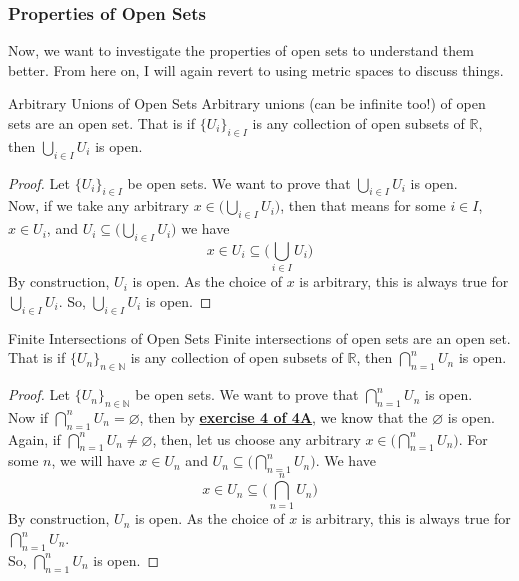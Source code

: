 \subsubsection{Properties of Open Sets}
\noindent Now, we want to investigate the properties of open sets to understand them better. From here on, I will again revert to using metric spaces to discuss things.
\begin{Theorem}{Arbitrary Unions of Open Sets}\label{union_open_sets}
    Arbitrary unions (can be infinite too!) of open sets are an open set. That is if $\{U_i\}_{i\in I}$ is any collection of open subsets of $\mathbb{R}$, then $\bigcup_{i\in I}U_i$ is open.
\end{Theorem}
\begin{proof}
    Let $\{U_i\}_{i\in I}$ be open sets. We want to prove that $\bigcup_{i\in I}U_i$ is open.\\
    Now, if we take any arbitrary $x\in\big(\bigcup_{i\in I}U_i\big)$, then that means for some $i\in I$, $x\in U_i$, and $U_i\subseteq\big(\bigcup_{i\in I}U_i\big)$ we have 
    $$x\in U_i\subseteq\big(\bigcup_{i\in I}U_i\big)$$
    By construction, $U_i$ is open. As the choice of $x$ is arbitrary, this is always true for $\bigcup_{i\in I}U_i$. So, $\bigcup_{i\in I}U_i$ is open.
\end{proof}
\begin{Theorem}{Finite Intersections of Open Sets}\label{finite_inter_open_sets}
    Finite intersections of open sets are an open set. That is if $\{U_n\}_{n\in \mathbb{N}}$ is any collection of open subsets of $\mathbb{R}$, then $\bigcap_{n=1}^n U_{n}$ is open.
\end{Theorem}
\begin{proof}
    Let $\{U_n\}_{n\in\mathbb{N}}$ be open sets. We want to prove that $\bigcap_{n=1}^nU_n$ is open.\\
    Now if $\bigcap_{n=1}^nU_n=\varnothing$, then by \underline{\textbf{exercise 4 of 4A}}, we know that the $\varnothing$ is open. \\
    \noindent Again, if $\bigcap_{n=1}^nU_n\neq\varnothing$, then, let us choose any arbitrary $x\in\big(\bigcap_{n=1}^nU_n\big)$. For some $n$, we will have $x\in U_n$ and $U_n\subseteq\big(\bigcap_{n=1}^nU_n\big)$. We have
    $$x\in U_n\subseteq\big(\bigcap_{n=1}^nU_n\big)$$
    By construction, $U_n$ is open. As the choice of $x$ is arbitrary, this is always true for $\bigcap_{n=1}^nU_n$.\\
    So, $\bigcap_{n=1}^nU_n$ is open.
\end{proof}
